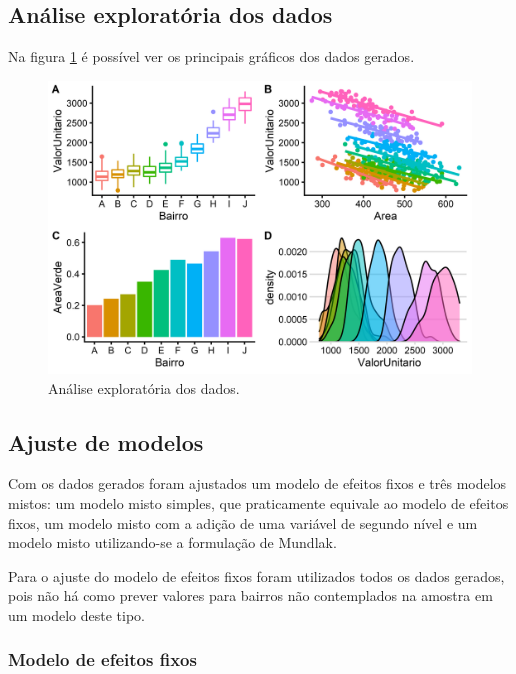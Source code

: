\documentclass[
  a4paper, 12pt]{article}
\begin{document}
\hypertarget{anuxe1lise-exploratuxf3ria-dos-dados}{%
\subsection{Análise exploratória dos
dados}\label{anuxe1lise-exploratuxf3ria-dos-dados}}

Na figura \ref{fig:exploratoria} é possível ver os principais gráficos
dos dados gerados.

\begin{figure}[H]

{\centering \includegraphics[width=1\linewidth]{images/exploratoria-1} 

}

\caption{Análise exploratória dos dados.}\label{fig:exploratoria}
\end{figure}

\hypertarget{ajuste-de-modelos}{%
\subsection{Ajuste de modelos}\label{ajuste-de-modelos}}

Com os dados gerados foram ajustados um modelo de efeitos fixos e três
modelos mistos: um modelo misto simples, que praticamente equivale ao
modelo de efeitos fixos, um modelo misto com a adição de uma variável de
segundo nível e um modelo misto utilizando-se a formulação de Mundlak.

Para o ajuste do modelo de efeitos fixos foram utilizados todos os dados
gerados, pois não há como prever valores para bairros não contemplados
na amostra em um modelo deste tipo.

\hypertarget{modelo-de-efeitos-fixos}{%
\subsubsection{Modelo de efeitos fixos}\label{modelo-de-efeitos-fixos}}
\end{document}
